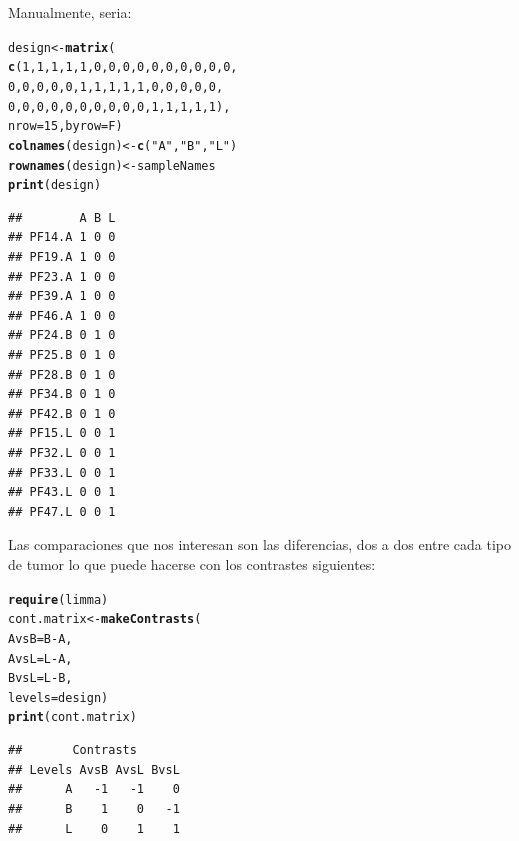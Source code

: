 \documentclass[a4paper]{article}\usepackage[]{graphicx}\usepackage[]{color}
\makeatletter
\newcommand{\hlnum}[1]{\textcolor[rgb]{0.686,0.059,0.569}{#1}}%
\newcommand{\hlstr}[1]{\textcolor[rgb]{0.192,0.494,0.8}{#1}}%
\newcommand{\hlopt}[1]{\textcolor[rgb]{0,0,0}{#1}}%
\newcommand{\hlstd}[1]{\textcolor[rgb]{0.345,0.345,0.345}{#1}}%
\newcommand{\hlkwb}[1]{\textcolor[rgb]{0.69,0.353,0.396}{#1}}%
\newcommand{\hlkwc}[1]{\textcolor[rgb]{0.333,0.667,0.333}{#1}}%
\newcommand{\hlkwd}[1]{\textcolor[rgb]{0.737,0.353,0.396}{\textbf{#1}}}%
\newenvironment{kframe}{%
 \def\at@end@of@kframe{}%
 \ifinner\ifhmode%
  \def\at@end@of@kframe{\end{minipage}}%
  \begin{minipage}{\columnwidth}%
 \fi\fi%
 \def\FrameCommand##1{\hskip\@totalleftmargin \hskip-\fboxsep
 \colorbox{shadecolor}{##1}\hskip-\fboxsep
     \hskip-\linewidth \hskip-\@totalleftmargin \hskip\columnwidth}%
 \MakeFramed {\advance\hsize-\width
   \@totalleftmargin\z@ \linewidth\hsize
   \@setminipage}}%
 {\par\unskip\endMakeFramed%
 \at@end@of@kframe}
\newenvironment{knitrout}{}{} %
\makeatother
\begin{document}
Manualmente, seria:
\begin{knitrout}
\color{fgcolor}\begin{kframe}
\begin{alltt}
\hlstd{design}\hlkwb{<-}\hlkwd{matrix}\hlstd{(}
            \hlkwd{c}\hlstd{(}\hlnum{1}\hlstd{,}\hlnum{1}\hlstd{,}\hlnum{1}\hlstd{,}\hlnum{1}\hlstd{,}\hlnum{1}\hlstd{,}\hlnum{0}\hlstd{,}\hlnum{0}\hlstd{,}\hlnum{0}\hlstd{,}\hlnum{0}\hlstd{,}\hlnum{0}\hlstd{,}\hlnum{0}\hlstd{,}\hlnum{0}\hlstd{,}\hlnum{0}\hlstd{,}\hlnum{0}\hlstd{,}\hlnum{0}\hlstd{,}
              \hlnum{0}\hlstd{,}\hlnum{0}\hlstd{,}\hlnum{0}\hlstd{,}\hlnum{0}\hlstd{,}\hlnum{0}\hlstd{,}\hlnum{1}\hlstd{,}\hlnum{1}\hlstd{,}\hlnum{1}\hlstd{,}\hlnum{1}\hlstd{,}\hlnum{1}\hlstd{,}\hlnum{0}\hlstd{,}\hlnum{0}\hlstd{,}\hlnum{0}\hlstd{,}\hlnum{0}\hlstd{,}\hlnum{0}\hlstd{,}
              \hlnum{0}\hlstd{,}\hlnum{0}\hlstd{,}\hlnum{0}\hlstd{,}\hlnum{0}\hlstd{,}\hlnum{0}\hlstd{,}\hlnum{0}\hlstd{,}\hlnum{0}\hlstd{,}\hlnum{0}\hlstd{,}\hlnum{0}\hlstd{,}\hlnum{0}\hlstd{,}\hlnum{1}\hlstd{,}\hlnum{1}\hlstd{,}\hlnum{1}\hlstd{,}\hlnum{1}\hlstd{,}\hlnum{1}\hlstd{),}
            \hlkwc{nrow}\hlstd{=}\hlnum{15}\hlstd{,}\hlkwc{byrow}\hlstd{=F)}
\hlkwd{colnames}\hlstd{(design)}\hlkwb{<-}\hlkwd{c}\hlstd{(}\hlstr{"A"}\hlstd{,} \hlstr{"B"}\hlstd{,} \hlstr{"L"}\hlstd{)}
\hlkwd{rownames}\hlstd{(design)} \hlkwb{<-}  \hlstd{sampleNames}
\hlkwd{print}\hlstd{(design)}
\end{alltt}
\begin{verbatim}
##        A B L
## PF14.A 1 0 0
## PF19.A 1 0 0
## PF23.A 1 0 0
## PF39.A 1 0 0
## PF46.A 1 0 0
## PF24.B 0 1 0
## PF25.B 0 1 0
## PF28.B 0 1 0
## PF34.B 0 1 0
## PF42.B 0 1 0
## PF15.L 0 0 1
## PF32.L 0 0 1
## PF33.L 0 0 1
## PF43.L 0 0 1
## PF47.L 0 0 1
\end{verbatim}
\end{kframe}
\end{knitrout}

Las comparaciones que nos interesan son las diferencias, dos a dos entre cada tipo de tumor lo que puede hacerse con los contrastes siguientes:

\begin{knitrout}
\color{fgcolor}\begin{kframe}
\begin{alltt}
\hlkwd{require}\hlstd{(limma)}
\hlstd{cont.matrix} \hlkwb{<-} \hlkwd{makeContrasts} \hlstd{(}
      \hlkwc{AvsB} \hlstd{= B}\hlopt{-}\hlstd{A,}
      \hlkwc{AvsL} \hlstd{= L}\hlopt{-}\hlstd{A,}
      \hlkwc{BvsL} \hlstd{= L}\hlopt{-}\hlstd{B,}
      \hlkwc{levels}\hlstd{=design)}
\hlkwd{print}\hlstd{(cont.matrix)}
\end{alltt}
\begin{verbatim}
##       Contrasts
## Levels AvsB AvsL BvsL
##      A   -1   -1    0
##      B    1    0   -1
##      L    0    1    1
\end{verbatim}
\end{kframe}
\end{knitrout}
\end{document}
